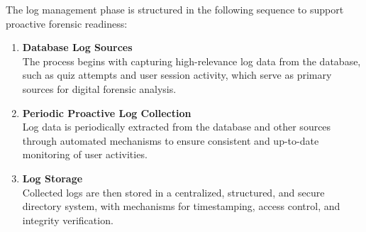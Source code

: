 The log management phase is structured in the following sequence to support proactive forensic readiness:

\begin{enumerate}
    \item \textbf{Database Log Sources} \\
    The process begins with capturing high-relevance log data from the database, such as quiz attempts and user session activity, which serve as primary sources for digital forensic analysis.

    \item \textbf{Periodic Proactive Log Collection} \\
    Log data is periodically extracted from the database and other sources through automated mechanisms to ensure consistent and up-to-date monitoring of user activities.

    \item \textbf{Log Storage} \\
    Collected logs are then stored in a centralized, structured, and secure directory system, with mechanisms for timestamping, access control, and integrity verification.
\end{enumerate}
